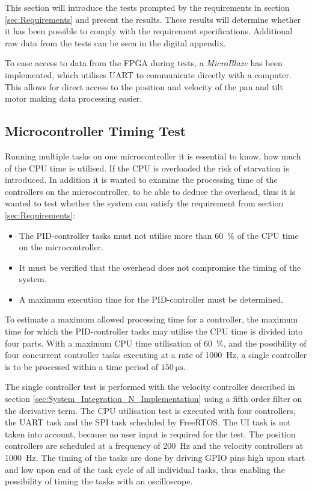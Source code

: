 \documentclass[../../main.tex]{subfiles}
\begin{document}
This section will introduce the tests prompted by the requirements in section \ref{sec:Requirements} and present the results. These results will determine whether it has been possible to comply with the requirement specifications. Additional raw data from the tests can be seen in the digital appendix. 

To ease access to data from the FPGA during tests, a \textit{MicroBlaze} has been implemented, which utilises UART to communicate directly with a computer. This allows for direct access to the position and velocity of the pan and tilt motor making data processing easier. 

\subsection{Microcontroller Timing Test}
Running multiple tasks on one microcontroller it is essential to know, how much of the CPU time is utilised. If the CPU is overloaded the risk of starvation is introduced. In addition it is wanted to examine the processing time of the controllers on the microcontroller, to be able to deduce the overhead, thus it is wanted to test whether the system can satisfy the requirement from section \ref{sec:Requirements}:
\begin{itemize}
    \item The PID-controller tasks must not utilise more than \SI{60}{\percent} of the CPU time on the microcontroller.
    \item It must be verified that the overhead does not compromise the timing of the system.
    \item A maximum execution time for the PID-controller must be determined.
\end{itemize}

To estimate a maximum allowed processing time for a controller, the maximum time for which the PID-controller tasks may utilise the CPU time is divided into four parts. With a maximum CPU time utilisation of \SI{60}{\percent}, and the possibility of four concurrent controller tasks executing at a rate of \SI{1000}{\hertz}, a single controller is to be processed within a time period of $\SI{150}{\micro \second}$.

The single controller test is performed with the velocity controller described in section \ref{sec:System_Integration_N_Implementation} using a fifth order filter on the derivative term. The CPU utilisation test is executed with four controllers, the UART task and the SPI task scheduled by FreeRTOS. The UI task is not taken into account, because no user input is required for the test. The position controllers are scheduled at a frequency of \SI{200}{\hertz} and the velocity controllers at \SI{1000}{\hertz}. The timing of the tasks are done by driving GPIO pins high upon start and low upon end of the task cycle of all individual tasks, thus enabling the possibility of timing the tasks with an oscilloscope.
\end{document}

